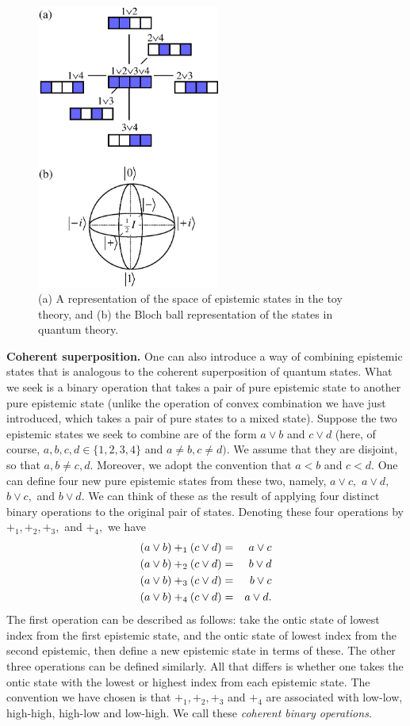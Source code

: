 \documentclass[pra,nofootinbib,showpacs,12pt]{revtex4}
\begin{document}
\begin{figure}[h]
\includegraphics[width=60mm]{Blochspherevertical.eps}
\caption{(a) A representation of the space of epistemic states in the toy
theory, and (b) the Bloch ball representation of the states in quantum
theory.}
\label{Blochsphere}
\end{figure}

\textbf{Coherent superposition.} One can also introduce a way of combining
epistemic states that is analogous to the coherent superposition of quantum
states. What we seek is a binary operation that takes a pair of pure
epistemic state to another pure epistemic state (unlike the operation of
convex combination we have just introduced, which takes a pair of pure
states to a mixed state). Suppose the two epistemic states we seek to
combine are of the form $a\vee b$ and $c\vee d$ (here, of course, $%
a,b,c,d\in \{1,2,3,4\}$ and $a\ne b,c\ne d).$ We assume that they are
disjoint, so that $a,b\ne c,d.$ Moreover, we adopt the convention that $a<b$
and $c<d.$ One can define four new pure epistemic states from these two,
namely, $a\vee c,$ $a\vee d,$ $b\vee c,$ and $b\vee d. $ We can think of
these as the result of applying four distinct binary operations to the
original pair of states. Denoting these four operations by $%
+_{1},+_{2},+_{3},$ and $+_{4},$ we have
\begin{eqnarray}
(a\vee b)+_{1}(c\vee d) &=&a\vee c  \notag \\
(a\vee b)+_{2}(c\vee d) &=&b\vee d  \notag \\
(a\vee b)+_{3}(c\vee d) &=&b\vee c  \notag \\
(a\vee b)+_{4}(c\vee d) &=&a\vee d.
\end{eqnarray}
The first operation can be described as follows: take the ontic state of
lowest index from the first epistemic state, and the ontic state of lowest
index from the second epistemic, then define a new epistemic state in terms
of these. The other three operations can be defined similarly. All that
differs is whether one takes the ontic state with the lowest or highest
index from each epistemic state. The convention we have chosen is that $%
+_{1},+_{2},+_{3}$ and $+_{4}$ are associated with low-low, high-high,
high-low and low-high. We call these \emph{coherent binary operations.}
\end{document}
